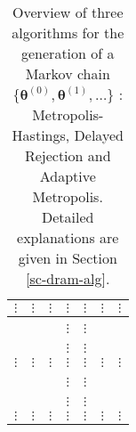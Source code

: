 \begin{sidewaystable}
\begin{tabular}{|c||c|c||c|c||c|c|}
\hline
\hline
$\vdots$    & $\vdots$      & $\vdots$                  & $\vdots$      & $\vdots$                & $\vdots$      & $\vdots$                 \\
\hline
\hline
            &               &                           &               &                         &               &                          \\
\cline{4-5}
            &               &                           & $\vdots$      & $\vdots$                &               &                          \\
\hline
\hline
            &               &                           &               &                         &               &                          \\
\cline{4-5}
            &               &                           & $\vdots$      & $\vdots$                &               &                          \\
\hline
\hline
$\vdots$    & $\vdots$      & $\vdots$                  & $\vdots$      & $\vdots$                & $\vdots$      & $\vdots$                 \\
\hline
\hline
            &               &                           &               &                         &               &                          \\
\cline{4-5}
            &               &                           & $\vdots$      & $\vdots$                &               &                          \\
\hline
\hline
            &               &                           &               &                         &               &                          \\
\cline{4-5}
            &               &                           & $\vdots$      & $\vdots$                &               &                          \\
\hline
\hline
$\vdots$    & $\vdots$      & $\vdots$                  & $\vdots$      & $\vdots$                & $\vdots$      & $\vdots$                 \\
\hline
\end{tabular}
\caption{Overview of three algorithms for the generation of a Markov chain 
$\{\boldsymbol{\theta}^{(0)},\boldsymbol{\theta}^{(1)},\ldots\}$
: Metropolis-Hastings, Delayed Rejection and Adaptive Metropolis.
Detailed explanations are given in Section \ref{sc-dram-alg}.}
\label{tab-dram}
\end{sidewaystable}

